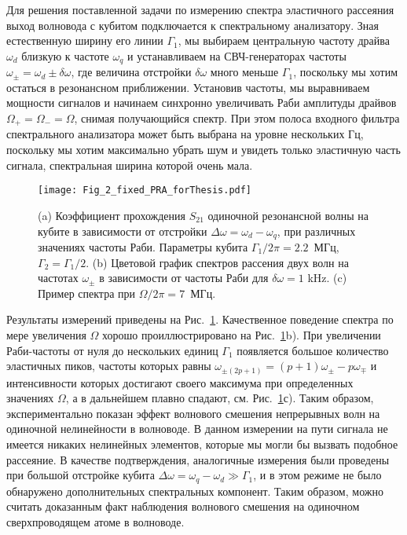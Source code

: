 Для решения поставленной задачи по измерению спектра эластичного рассеяния выход волновода с кубитом подключается к спектральному анализатору.  Зная естественную ширину его линии $\Gamma_1$, мы выбираем центральную частоту драйва $\omega_d$ близкую к частоте $\omega_q$ и устанавливаем на СВЧ-генераторах частоты $\omega_\pm = \omega_d \pm \delta\omega$, где величина отстройки $\delta\omega$ много меньше $\Gamma_1$, поскольку мы хотим остаться в резонансном приближении. Установив частоты, мы выравниваем мощности сигналов и начинаем синхронно увеличивать Раби амплитуды драйвов $\Omega_+ = \Omega_- = \Omega$, снимая получающийся спектр. При этом полоса входного фильтра спектрального анализатора может быть выбрана на уровне нескольких Гц, поскольку мы хотим максимально убрать шум и увидеть только эластичную часть сигнала, спектральная ширина которой очень мала.
\begin{figure}[thb]
	\centering
	\texttt{[image: Fig\_2\_fixed\_PRA\_forThesis.pdf]}
	\caption[Волновое смешение: появление дополнительных компонент эластично рассеянного сигнала]{(a) Коэффициент прохождения $S_{21}$ одиночной резонансной волны на кубите в зависимости от отстройки $\Delta\omega = \omega_d-\omega_q$, при различных значениях частоты Раби. Параметры кубита $\Gamma_1/2\pi = 2.2$~МГц, $\Gamma_2 = \Gamma_1/2$. (b) Цветовой график спектров рассения двух волн на частотах $\omega_{\pm}$ в зависимости от частоты Раби для $\delta\omega = 1$ kHz. (c) Пример спектра при $\Omega/2\pi=7$~МГц. }
	\label{fig: CWM}
\end{figure}
Результаты измерений приведены на Рис.~\ref{fig: CWM}. Качественное поведение спектра по мере увеличения $\Omega$ хорошо проиллюстрировано на Рис.~\ref{fig: CWM}b). При увеличении Раби-частоты от нуля до нескольких единиц $\Gamma_1$ появляется большое количество эластичных пиков, частоты которых равны $\omega_{\pm(2p+1)} = (p+1)\omega_\pm-p\omega_\mp$ и интенсивности которых достигают своего максимума при определенных значениях $\Omega$, а в дальнейшем плавно спадают, см.  Рис.~\ref{fig: CWM}с). Таким образом, экспериментально показан эффект волнового смешения непрерывных волн на одиночной нелинейности в волноводе. В данном измерении на пути сигнала не имеется никаких нелинейных элементов, которые мы могли бы вызвать подобное рассеяние. В качестве подтверждения, аналогичные измерения были проведены при большой отстройке кубита $\Delta\omega = \omega_q - \omega_d \gg \Gamma_1 $, и в этом режиме не было обнаружено дополнительных спектральных компонент. Таким образом, можно считать доказанным факт наблюдения волнового смешения на одиночном сверхпроводящем атоме в волноводе.  

